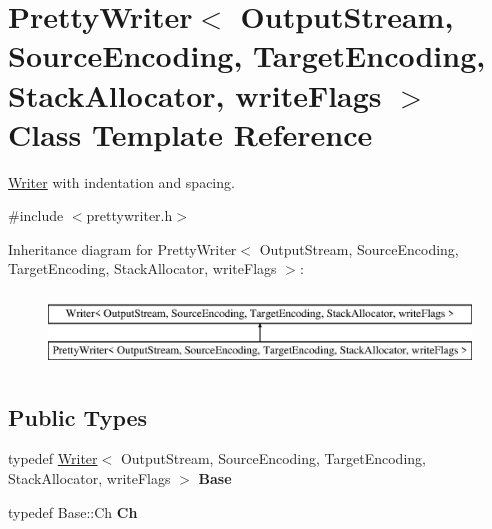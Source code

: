 \hypertarget{a00232}{}\section{Pretty\+Writer$<$ Output\+Stream, Source\+Encoding, Target\+Encoding, Stack\+Allocator, write\+Flags $>$ Class Template Reference}
\label{a00232}


\hyperlink{a00335}{Writer} with indentation and spacing.  




{\ttfamily \#include $<$prettywriter.\+h$>$}

Inheritance diagram for Pretty\+Writer$<$ Output\+Stream, Source\+Encoding, Target\+Encoding, Stack\+Allocator, write\+Flags $>$\+:\begin{figure}[H]
\begin{center}
\leavevmode
\includegraphics[height=2.000000cm]{a00232}
\end{center}
\end{figure}
\subsection*{Public Types}
\begin{DoxyCompactItemize}
\item 
typedef \hyperlink{a00335}{Writer}$<$ Output\+Stream, Source\+Encoding, Target\+Encoding, Stack\+Allocator, write\+Flags $>$ {\bfseries Base}\hypertarget{a00232_a6eecc5c896dcdaffca739dcd39d13a17}{}\label{a00232_a6eecc5c896dcdaffca739dcd39d13a17}

\item 
typedef Base\+::\+Ch {\bfseries Ch}\hypertarget{a00232_ae35c89bda4c5d59d3ff6efcf2fea45a3}{}\label{a00232_ae35c89bda4c5d59d3ff6efcf2fea45a3}

\end{DoxyCompactItemize}
